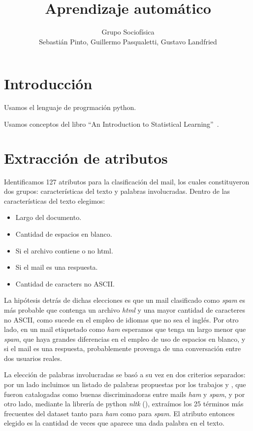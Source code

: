 \documentclass[a4paper,10pt]{article}
\title{Aprendizaje autom\'atico}
\author{Grupo Sociof\'isica \\
Sebasti\'an Pinto, Guillermo Pasqualetti, Gustavo Landfried}
\begin{document}
\maketitle

\section{Introducci\'on}

Usamos el lenguaje de progrmaci\'on python. 

Usamos conceptos del libro ``An Introduction to Statistical Learning''~\cite{james_hastie_tibshirani}.

\section{Extracci\'on de atributos}

\par Identificamos 127 atributos para la clasificación del mail, los cuales constituyeron dos grupos: características del texto y palabras involucradas. Dentro de las características del texto elegimos:
\begin{itemize}
\item Largo del documento.
\item Cantidad de espacios en blanco.
\item Si el archivo contiene o no html.
\item Si el mail es una respuesta.
\item Cantidad de caracters no ASCII.
\end{itemize}
La hipótesis detrás de dichas elecciones es que un mail clasificado como \emph{spam} es más probable que contenga un archivo \emph{html} y una mayor cantidad de caracteres no ASCII, como sucede en el empleo de idiomas que no sea el inglés. Por otro lado, en un mail etiquetado como \emph{ham} esperamos que tenga un largo menor que \emph{spam}, que haya grandes diferencias en el empleo de uso de espacios en blanco, y si el mail es una respuesta, probablemente provenga de una conversación entre dos usuarios reales.
\par La elección de palabras involucradas se basó a su vez en dos criterios separados: por un lado incluimos un listado de palabras propuestas por los trabajos \cite{Gunal} y \cite{Vaughan}, que fueron catalogadas como buenas discriminadoras entre mails \emph{ham} y \emph{spam}, y por otro lado, mediante la librería de python \emph{nltk} (\cite{nltk}), extraímos los 25 términos más frecuentes del dataset tanto para \emph{ham} como para \emph{spam}. El atributo entonces elegido es la cantidad de veces que aparece una dada palabra en el texto.
\end{document}
